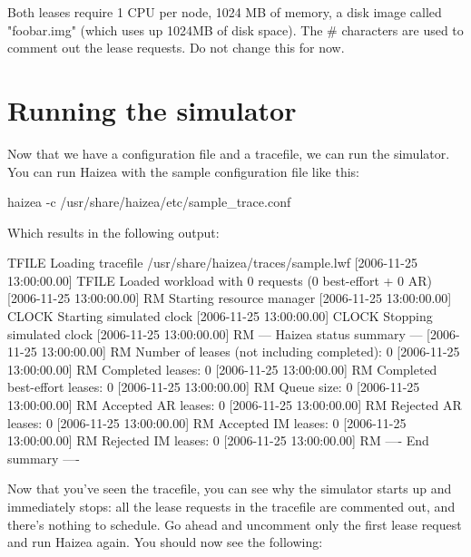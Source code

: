 Both leases require 1 CPU per node, 1024 MB of memory, a disk image called "foobar.img" (which uses up 1024MB of disk space). The \# characters are used to comment out the lease requests. Do not change this for now.

\section{Running the simulator}

Now that we have a configuration file and a tracefile, we can run the simulator. You can run Haizea with the sample configuration file like this:

\begin{shellverbatim}
haizea -c /usr/share/haizea/etc/sample_trace.conf 
\end{shellverbatim}

Which results in the following output:

\begin{wideshellverbatim}
[2006-11-25 13:00:00.00] TFILE   Loading tracefile /usr/share/haizea/traces/sample.lwf
[2006-11-25 13:00:00.00] TFILE   Loaded workload with 0 requests (0 best-effort + 0 AR)
[2006-11-25 13:00:00.00] RM      Starting resource manager
[2006-11-25 13:00:00.00] CLOCK   Starting simulated clock
[2006-11-25 13:00:00.00] CLOCK   Stopping simulated clock
[2006-11-25 13:00:00.00] RM      --- Haizea status summary ---
[2006-11-25 13:00:00.00] RM      Number of leases (not including completed): 0
[2006-11-25 13:00:00.00] RM      Completed leases: 0
[2006-11-25 13:00:00.00] RM      Completed best-effort leases: 0
[2006-11-25 13:00:00.00] RM      Queue size: 0
[2006-11-25 13:00:00.00] RM      Accepted AR leases: 0
[2006-11-25 13:00:00.00] RM      Rejected AR leases: 0
[2006-11-25 13:00:00.00] RM      Accepted IM leases: 0
[2006-11-25 13:00:00.00] RM      Rejected IM leases: 0
[2006-11-25 13:00:00.00] RM      ---- End summary ----
\end{wideshellverbatim}

Now that you've seen the tracefile, you can see why the simulator starts up and immediately stops: all the lease requests in the tracefile are commented out, and there's nothing to schedule. Go ahead and uncomment only the first lease request and run Haizea again. You should now see the following:

